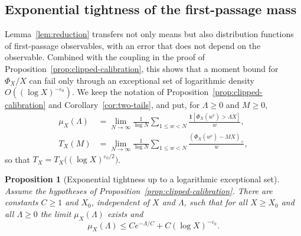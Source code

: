 \documentclass[12pt]{amsart}
\newtheorem{proposition}{Proposition}
\theoremstyle{definition}
\theoremstyle{remark}
\begin{document}
\subsection{Exponential tightness of the first-passage mass}
\label{subsec:tightness}
Lemma~\ref{lem:reduction} transfers not only means but also
distribution functions of first-passage observables, with an error that
does not depend on the observable. Combined with the coupling in the
proof of Proposition~\ref{prop:clipped-calibration}, this shows that a
moment bound for $\Phi_X/X$ can fail only through an exceptional set of
logarithmic density $O((\log X)^{-\varepsilon_0})$. We keep the notation
of Proposition~\ref{prop:clipped-calibration} and
Corollary~\ref{cor:two-tails}, and put, for $\Lambda\ge0$ and $M\ge0$,
\[
 \begin{aligned}
 \mu_X(\Lambda)&=\lim_{N\to\infty}\frac1{\log N}
   \sum_{1\le w<N}\frac{\mathbf 1[\Phi_X(w^\flat)>\Lambda X]}{w},\\
 T_X(M)&=\lim_{N\to\infty}\frac1{\log N}
   \sum_{1\le w<N}\frac{(\Phi_X(w^\flat)-MX)_+}{w},
 \end{aligned}
\]
so that $T_X=T_X\bigl((\log X)^{\varepsilon_0/2}\bigr)$.

\begin{proposition}[Exponential tightness up to a logarithmic exceptional set]
\label{prop:tightness}
Assume the hypotheses of Proposition~\ref{prop:clipped-calibration}.
There are constants $C\ge1$ and $X_0$, independent of $X$ and $\Lambda$, such that
for all $X\ge X_0$ and all $\Lambda\ge0$ the limit $\mu_X(\Lambda)$
exists and
\begin{equation}\label{eq:tightness}
 \mu_X(\Lambda)\le C e^{-\Lambda/C}+C(\log X)^{-\varepsilon_0}.
\end{equation}
\end{proposition}
\end{document}
